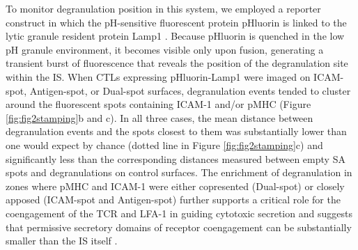 To monitor degranulation position in this system, we employed a reporter construct in which the pH-sensitive fluorescent protein pHluorin is linked to the lytic granule resident protein Lamp1 \cite{Rak2011}. Because pHluorin is quenched in the low pH granule environment, it becomes visible only upon fusion, generating a transient burst of fluorescence that reveals the position of the degranulation site within the IS. When CTLs expressing pHluorin-Lamp1 were imaged on ICAM-spot, Antigen-spot, or Dual-spot surfaces, degranulation events tended to cluster around the fluorescent spots containing ICAM-1 and/or pMHC (Figure \ref{fig:fig2stamping}b and c). In all three cases, the mean distance between degranulation events and the spots closest to them was substantially lower than one would expect by chance (dotted line in Figure \ref{fig:fig2stamping}c) and significantly less than the corresponding distances measured between empty SA spots and degranulations on control surfaces. The enrichment of degranulation in zones where pMHC and ICAM-1 were either copresented (Dual-spot) or closely apposed (ICAM-spot and Antigen-spot) further supports a critical role for the coengagement of the TCR and LFA-1 in guiding cytotoxic secretion and suggests that permissive secretory domains of receptor coengagement can be substantially smaller than the IS itself \cite{Verron2021}.

